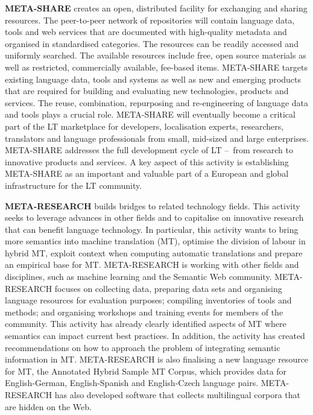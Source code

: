 \documentclass[]{../../metanetpaper}
\begin{document}
\begin{multicols}{2}
\textbf{META-SHARE} creates an open, distributed facility for exchanging and sharing resources. The peer-to-peer network of repositories will contain language data, tools and web services that are documented with high-quality metadata and organised in standardised categories. The resources can be readily accessed and uniformly searched. The available resources include free, open source materials as well as restricted, commercially available, fee-based items. META-SHARE targets existing language data, tools and systems as well as new and emerging products that are required for building and evaluating new technologies, products and services. The reuse, combination, repurposing and re-engineering of language data and tools plays a crucial role. META-SHARE will eventually become a critical part of the LT marketplace for developers, localisation experts, researchers, translators and language professionals from small, mid-sized and large enterprises. META-SHARE addresses the full development cycle of LT --~from research to innovative products and services. A key aspect of this activity is establishing META-SHARE as an important and valuable part of a European and global infrastructure for the LT community. 

\textbf{META-RESEARCH} builds bridges to related technology fields. This activity seeks to leverage advances in other fields and to capitalise on innovative research that can benefit language technology. In particular, this activity wants to bring more semantics into machine translation (MT), optimise the division of labour in hybrid MT, exploit context when computing automatic translations and prepare an empirical base for MT. META-RESEARCH is working with other fields and disciplines, such as machine learning and the Semantic Web community. META-RESEARCH focuses on collecting data, preparing data sets and organising language resources for evaluation purposes; compiling inventories of tools and methods; and organising workshops and training events for members of the community. This activity has already clearly identified aspects of MT where semantics can impact current best practices. In addition, the activity has created recommendations on how to approach the problem of integrating semantic information in MT. META-RESEARCH is also finalising a new language resource for MT, the Annotated Hybrid Sample MT Corpus, which provides data for English-German, English-Spanish and English-Czech language pairs. META-RESEARCH has also developed software that collects multilingual corpora that are hidden on the Web.
\end{multicols}
\end{document}
